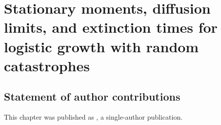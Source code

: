 



\def\reals{\mathbb{R}}
\def\be{\begin{equation}}
\def\ee{\end{equation}}
\def\bea{\begin{eqnarray}}
\def\eea{\end{eqnarray}}
\def\bml{\begin{mathletters}}
\def\eml{\end{mathletters}}
\def\bse{\begin{subequations}}
\def\ese{\end{subequations}}
\def\expec{\mathbb{E}}
\def\exp{\text{exp}}
\def\Var{\text{Var}}
\def\e{\text{e}}

\chapter{Stationary moments, diffusion limits, and extinction times for logistic growth with random catastrophes}

\section{Statement of author contributions}
This chapter was published as \cite{schlomann2018stationary}, a single-author publication.

